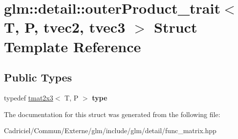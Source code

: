 \hypertarget{structglm_1_1detail_1_1outer_product__trait_3_01_t_00_01_p_00_01tvec2_00_01tvec3_01_4}{}\section{glm\+:\+:detail\+:\+:outer\+Product\+\_\+trait$<$ T, P, tvec2, tvec3 $>$ Struct Template Reference}
\label{structglm_1_1detail_1_1outer_product__trait_3_01_t_00_01_p_00_01tvec2_00_01tvec3_01_4}
\subsection*{Public Types}
\begin{DoxyCompactItemize}
\item 
typedef \hyperlink{structglm_1_1detail_1_1tmat2x3}{tmat2x3}$<$ T, P $>$ {\bfseries type}\hypertarget{structglm_1_1detail_1_1outer_product__trait_3_01_t_00_01_p_00_01tvec2_00_01tvec3_01_4_a960af058d12b8de3d79562804f768d0d}{}\label{structglm_1_1detail_1_1outer_product__trait_3_01_t_00_01_p_00_01tvec2_00_01tvec3_01_4_a960af058d12b8de3d79562804f768d0d}

\end{DoxyCompactItemize}


The documentation for this struct was generated from the following file\+:\begin{DoxyCompactItemize}
\item 
Cadriciel/\+Commun/\+Externe/glm/include/glm/detail/func\+\_\+matrix.\+hpp\end{DoxyCompactItemize}
